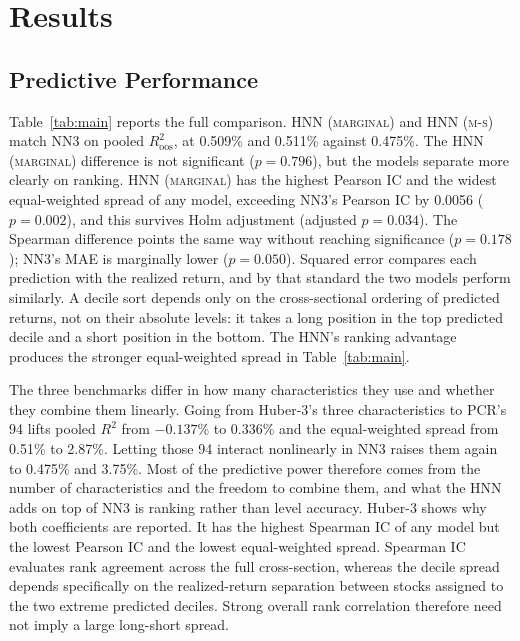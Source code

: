 \documentclass[sigconf,nonacm]{acmart}
\newcommand{\MSRtwo}{0.511}
\newcommand{\HNNRtwo}{0.509}
\newcommand{\NNRtwo}{0.475}
\newcommand{\HNNNNP}{0.796}
\newcommand{\HNNNNPearsonP}{0.002}
\newcommand{\HNNNNPearsonHolmP}{0.034}
\newcommand{\HNNMarg}{\textsc{HNN (marginal)}}
\newcommand{\HNNMS}{\textsc{HNN (m-s)}}
\newcommand{\NNThree}{\textsc{NN3}}
\begin{document}



\section{Results}\label{re}




\subsection{Predictive Performance}


Table~\ref{tab:main} reports the full comparison. \HNNMarg{} and \HNNMS{} match
\NNThree{} on pooled \(R^2_{\mathrm{oos}}\), at \HNNRtwo\% and \MSRtwo\% against
\NNRtwo\%. The \HNNMarg{} difference is not significant
(\(p=\HNNNNP\)), but the models separate more clearly on ranking. \HNNMarg{} has the highest
Pearson IC and the widest equal-weighted spread of any model, exceeding
\NNThree{}'s Pearson IC by 0.0056 (\(p=\HNNNNPearsonP\)), and this survives Holm adjustment (adjusted \(p=\HNNNNPearsonHolmP\)). The Spearman
difference points the same way without reaching significance (\(p=0.178\));
\NNThree{}'s MAE is marginally lower (\(p=0.050\)). Squared error compares each prediction with the realized return, and by that
standard the two models perform similarly. A decile sort depends only on the cross-sectional ordering of predicted returns, not on their absolute levels: it takes a long position in the top predicted decile and a short position in the bottom. The HNN's ranking advantage produces the stronger equal-weighted spread in
Table~\ref{tab:main}.





The three benchmarks differ in how many characteristics they use and whether
they combine them linearly. Going from Huber-3's three characteristics to PCR's
94 lifts pooled \(R^2\) from \(-0.137\)\% to 0.336\% and the equal-weighted
spread from 0.51\% to 2.87\%. Letting those 94 interact nonlinearly in
\NNThree{} raises them again to \NNRtwo\% and 3.75\%. Most of the predictive
power therefore comes from the number of characteristics and the freedom to
combine them, and what the HNN adds on top of \NNThree{} is ranking rather than
level accuracy. Huber-3 shows why both coefficients are reported. It has the highest Spearman IC
of any model but the lowest Pearson IC and the lowest equal-weighted spread.
Spearman IC evaluates rank agreement across the full cross-section, whereas the
decile spread depends specifically on the realized-return separation between
stocks assigned to the two extreme predicted deciles. Strong overall rank
correlation therefore need not imply a large long-short spread.
\end{document}
